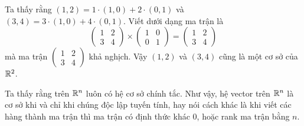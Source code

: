 Ta thấy rằng $(1, 2) = 1 \cdot (1, 0) + 2 \cdot (0, 1)$
và $(3, 4) = 3 \cdot (1, 0) + 4 \cdot (0, 1)$. Viết dưới 
dạng ma trận là
\[
    \begin{pmatrix} 1 & 2 \\ 3 & 4 \end{pmatrix}
    \times \begin{pmatrix} 1 & 0 \\ 0 & 1 \end{pmatrix}
    = \begin{pmatrix} 1 & 2 \\ 3 & 4 \end{pmatrix}
\]
mà ma trận $\begin{pmatrix} 1 & 2 \\ 3 & 4 \end{pmatrix}$
khả nghịch. Vậy $(1, 2)$ và $(3, 4)$ cũng là một cơ sở của $\mathbb{R}^2$.

\begin{remark}
    Ta thấy rằng trên $\mathbb{R}^n$ luôn có hệ cơ sở chính tắc.
    Như vậy, hệ vector trên $\mathbb{R}^n$ là cơ sở khi và chỉ khi 
    chúng độc lập tuyến tính, hay nói cách khác là khi viết 
    các hàng thành ma trận thì ma trận có định thức khác 0,
    hoặc rank ma trận bằng $n$.
\end{remark}
